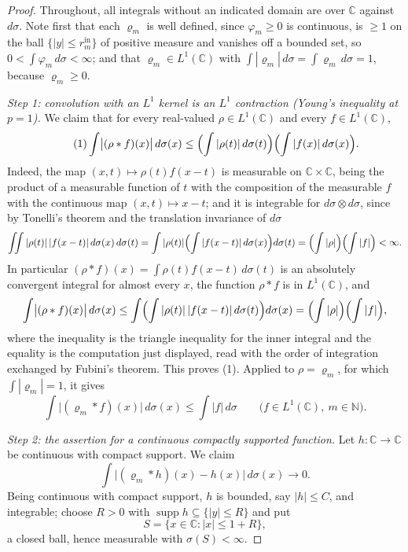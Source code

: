 \begin{proof}
Throughout, all integrals without an indicated domain are over $\mathbb{C}$
against $d\sigma$.  Note first that each $\varrho_m$ is well defined, since
$\varphi_m\ge0$ is continuous, is $\ge1$ on the ball $\{|y|\le
r_m^{\mathrm{in}}\}$ of positive measure and vanishes off a bounded set, so
$0<\int\varphi_m\,d\sigma<\infty$; and that $\varrho_m\in L^{1}(\mathbb{C})$
with $\int|\varrho_m|\,d\sigma=\int\varrho_m\,d\sigma=1$, because
$\varrho_m\ge0$.

\emph{Step 1: convolution with an $L^{1}$ kernel is an $L^{1}$ contraction
(Young's inequality at $p=1$).}  We claim that for every real-valued
$\rho\in L^{1}(\mathbb{C})$ and every $f\in L^{1}(\mathbb{C})$,
\begin{equation}\tag{1}
  \int\bigl|(\rho*f)(x)\bigr|\,d\sigma(x)
  \le\Bigl(\int|\rho(t)|\,d\sigma(t)\Bigr)
     \Bigl(\int|f(x)|\,d\sigma(x)\Bigr).
\end{equation}
Indeed, the map $(x,t)\mapsto\rho(t)f(x-t)$ is measurable on
$\mathbb{C}\times\mathbb{C}$, being the product of a measurable function of
$t$ with the composition of the measurable $f$ with the continuous map
$(x,t)\mapsto x-t$; and it is integrable for $d\sigma\otimes d\sigma$, since
by Tonelli's theorem and the translation invariance of $d\sigma$
\[
  \iint|\rho(t)|\,|f(x-t)|\,d\sigma(x)\,d\sigma(t)
  =\int|\rho(t)|\Bigl(\int|f(x-t)|\,d\sigma(x)\Bigr)d\sigma(t)
  =\Bigl(\int|\rho|\Bigr)\Bigl(\int|f|\Bigr)<\infty .
\]
In particular $(\rho*f)(x)=\int\rho(t)f(x-t)\,d\sigma(t)$ is an absolutely
convergent integral for almost every $x$, the function $\rho*f$ is in
$L^{1}(\mathbb{C})$, and
\[
  \int\bigl|(\rho*f)(x)\bigr|\,d\sigma(x)
  \le\int\Bigl(\int|\rho(t)|\,|f(x-t)|\,d\sigma(t)\Bigr)d\sigma(x)
  =\Bigl(\int|\rho|\Bigr)\Bigl(\int|f|\Bigr),
\]
where the inequality is the triangle inequality for the inner integral
and the equality is the computation just displayed, read with the order of
integration exchanged by Fubini's theorem.  This proves (1).  Applied to
$\rho=\varrho_m$, for which $\int|\varrho_m|=1$, it gives
\begin{equation}\tag{2}
  \int\bigl|(\varrho_m*f)(x)\bigr|\,d\sigma(x)\le\int|f|\,d\sigma
  \qquad\bigl(f\in L^{1}(\mathbb{C}),\ m\in\mathbb{N}\bigr).
\end{equation}

\emph{Step 2: the assertion for a continuous compactly supported function.}
Let $h\colon\mathbb{C}\to\mathbb{C}$ be continuous with compact support.  We
claim
\begin{equation}\tag{3}
  \int\bigl|(\varrho_m*h)(x)-h(x)\bigr|\,d\sigma(x)\longrightarrow0 .
\end{equation}
Being continuous with compact support, $h$ is bounded, say $|h|\le C$, and
integrable; choose $R>0$ with $\operatorname{supp}h\subseteq\{|y|\le R\}$ and
put
\[
  S=\{x\in\mathbb{C}:|x|\le1+R\},
\]
a closed ball, hence measurable with $\sigma(S)<\infty$.


\end{proof}
